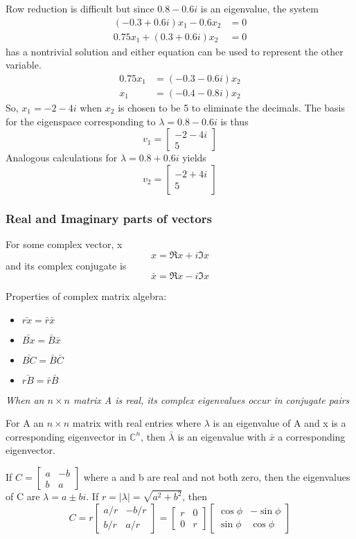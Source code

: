 \documentclass[12pt]{article} %
\begin{document}
Row reduction is difficult but since $0.8 - 0.6i$ is an eigenvalue, the system 
\begin{align*}
	(-0.3 + 0.6i)x_1 - 0.6x_2 &= 0\\
	0.75x_1 + (0.3 + 0.6i)x_2 &= 0
\end{align*}
has a nontrivial solution and either equation can be used to represent the other variable. 
\begin{align*}
	0.75x_1 &= (-0.3-0.6i)x_2\\
	x_1 &= (-0.4 - 0.8i)x_2
\end{align*}
So, $x_1 = -2 - 4i$ when $x_2$ is chosen to be 5 to eliminate the decimals. The basis for the eigenspace corresponding to $\lambda = 0.8 - 0.6i$ is thus 
$$v_1 = \begin{bmatrix}
	-2 -4i\\
	5
\end{bmatrix}$$
Analogous calculations for $\lambda = 0.8 + 0.6i$ yields 
$$v_2 = \begin{bmatrix}
	-2 + 4i\\
	5
\end{bmatrix}$$

\subsubsection{Real and Imaginary parts of vectors}
For some complex vector, x
$$x = \Re x + i \Im x$$
and its complex conjugate is 
$$\bar{x} = \Re x - i \Im x$$

Properties of complex matrix algebra:
\begin{itemize}
	\item $\bar{rx} = \bar{r} \bar{x}$
	\item $\bar{Bx} = \bar{B} \bar{x}$
	\item $\bar{BC} = \bar{B} \bar{C}$
	\item $\bar{rB} = \bar{r} \bar{B}$
\end{itemize}


\emph{When an $n \times n$ matrix A is real, its complex eigenvalues occur in conjugate pairs}

For A an $n \times n$ matrix with real entries where $\lambda$ is an eigenvalue of A and x is a corresponding eigenvector in $\mathbb{C}^n$, then $\bar{\lambda}$ is an eigenvalue with $\bar{x}$ a corresponding eigenvector.

If $C = \begin{bmatrix}
	a & -b\\
	b & a
\end{bmatrix}$ where a and b are real and not both zero, then the eigenvalues of C are $\lambda = a \pm bi$. If $r = |\lambda| = \sqrt{a^2 + b^2}$, then 
$$C = r\begin{bmatrix}
	a/r & -b/r\\
	b/r & a/r
\end{bmatrix} = \begin{bmatrix}
	r & 0\\
	0 & r
\end{bmatrix} \begin{bmatrix}
	\cos \phi & -\sin \phi\\
	\sin \phi & \cos \phi
\end{bmatrix}$$
\end{document}
